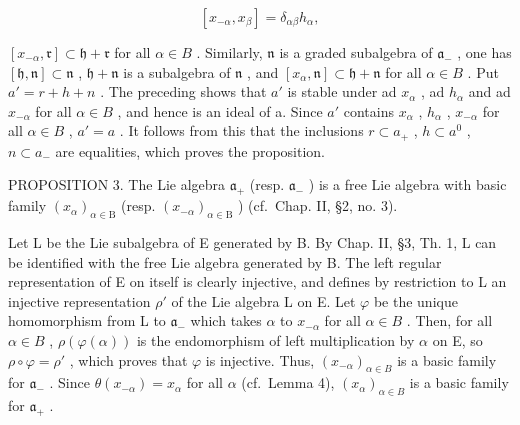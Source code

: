 \[
[ x _ {- \alpha}, x _ {\beta} ] = \delta_ {\alpha \beta} h _ {\alpha},
\]

\([x_{-\alpha}, \mathfrak{r}] \subset \mathfrak{h} + \mathfrak{r}\) for all \(\alpha \in B\) . Similarly, \(\mathfrak{n}\) is a graded subalgebra of \(\mathfrak{a}_{-}\) , one has \([\mathfrak{h}, \mathfrak{n}] \subset \mathfrak{n}\) , \(\mathfrak{h} + \mathfrak{n}\) is a subalgebra of \(\mathfrak{n}\) , and \([x_{\alpha}, \mathfrak{n}] \subset \mathfrak{h} + \mathfrak{n}\) for all \(\alpha \in B\) . Put \(a' = r + h + n\) . The preceding shows that \(a'\) is stable under ad \(x_{\alpha}\) , ad \(h_{\alpha}\) and ad \(x_{-\alpha}\) for all \(\alpha \in B\) , and hence is an ideal of a. Since \(a'\) contains \(x_{\alpha}\) , \(h_{\alpha}\) , \(x_{-\alpha}\) for all \(\alpha \in B\) , \(a' = a\) . It follows from this that the inclusions \(r \subset a_{+}\) , \(h \subset a^{0}\) , \(n \subset a_{-}\) are equalities, which proves the proposition.

PROPOSITION 3. The Lie algebra \(\mathfrak{a}_{+}\) (resp. \(\mathfrak{a}_{-}\) ) is a free Lie algebra with basic family \((x_{\alpha})_{\alpha \in \mathrm{B}}\) (resp. \((x_{-\alpha})_{\alpha \in \mathrm{B}}\) ) (cf.~Chap. II, §2, no. 3).

Let L be the Lie subalgebra of E generated by B. By Chap. II, §3, Th. 1, L can be identified with the free Lie algebra generated by B. The left regular representation of E on itself is clearly injective, and defines by restriction to L an injective representation \(\rho'\) of the Lie algebra L on E. Let \(\varphi\) be the unique homomorphism from L to \(\mathfrak{a}_{-}\) which takes \(\alpha\) to \(x_{-\alpha}\) for all \(\alpha \in B\) . Then, for all \(\alpha \in B\) , \(\rho(\varphi(\alpha))\) is the endomorphism of left multiplication by \(\alpha\) on E, so \(\rho \circ \varphi = \rho'\) , which proves that \(\varphi\) is injective. Thus, \((x_{-\alpha})_{\alpha \in B}\) is a basic family for \(\mathfrak{a}_{-}\) . Since \(\theta(x_{-\alpha}) = x_{\alpha}\) for all \(\alpha\) (cf.~Lemma 4), \((x_{\alpha})_{\alpha \in B}\) is a basic family for \(\mathfrak{a}_{+}\) .